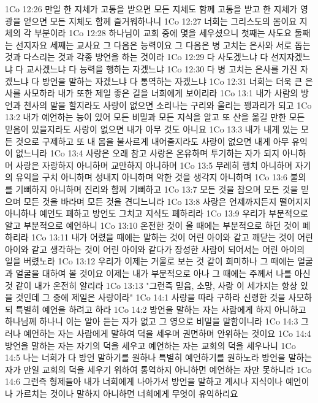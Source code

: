 1Co 12:26  만일 한 지체가 고통을 받으면 모든 지체도 함께 고통을 받고 한 지체가 영광을 얻으면 모든 지체도 함께 즐거워하나니
1Co 12:27  너희는 그리스도의 몸이요 지체의 각 부분이라
1Co 12:28  하나님이 교회 중에 몇을 세우셨으니 첫째는 사도요 둘째는 선지자요 세째는 교사요 그 다음은 능력이요 그 다음은 병 고치는 은사와 서로 돕는 것과 다스리는 것과 각종 방언을 하는 것이라
1Co 12:29  다 사도겠느냐 다 선지자겠느냐 다 교사겠느냐 다 능력을 행하는 자겠느냐
1Co 12:30  다 병 고치는 은사를 가진 자겠느냐 다 방언을 말하는 자겠느냐 다 통역하는 자겠느냐
1Co 12:31  너희는 더욱 큰 은사를 사모하라 내가 또한 제일 좋은 길을 너희에게 보이리라
1Co 13:1  내가 사람의 방언과 천사의 말을 할지라도 사랑이 없으면 소리나는 구리와 울리는 꽹과리가 되고
1Co 13:2  내가 예언하는 능이 있어 모든 비밀과 모든 지식을 알고 또 산을 옮길 만한 모든 믿음이 있을지라도 사랑이 없으면 내가 아무 것도 아니요
1Co 13:3  내가 내게 있는 모든 것으로 구제하고 또 내 몸을 불사르게 내어줄지라도 사랑이 없으면 내게 아무 유익이 없느니라
1Co 13:4  사랑은 오래 참고 사랑은 온유하며 투기하는 자가 되지 아니하며 사랑은 자랑하지 아니하며 교만하지 아니하며
1Co 13:5  무례히 행치 아니하며 자기의 유익을 구치 아니하며 성내지 아니하며 악한 것을 생각지 아니하며
1Co 13:6  불의를 기뻐하지 아니하며 진리와 함께 기뻐하고
1Co 13:7  모든 것을 참으며 모든 것을 믿으며 모든 것을 바라며 모든 것을 견디느니라
1Co 13:8  사랑은 언제까지든지 떨어지지 아니하나 예언도 폐하고 방언도 그치고 지식도 폐하리라
1Co 13:9  우리가 부분적으로 알고 부분적으로 예언하니
1Co 13:10  온전한 것이 올 때에는 부분적으로 하던 것이 폐하리라
1Co 13:11  내가 어렸을 때에는 말하는 것이 어린 아이와 같고 깨닫는 것이 어린 아이와 같고 생각하는 것이 어린 아이와 같다가 장성한 사람이 되어서는 어린 아이의 일을 버렸노라
1Co 13:12  우리가 이제는 거울로 보는 것 같이 희미하나 그 때에는 얼굴과 얼굴을 대하여 볼 것이요 이제는 내가 부분적으로 아나 그 때에는 주께서 나를 아신 것 같이 내가 온전히 알리라
1Co 13:13  "그런즉 믿음, 소망, 사랑 이 세가지는 항상 있을 것인데 그 중에 제일은 사랑이라"
1Co 14:1  사랑을 따라 구하라 신령한 것을 사모하되 특별히 예언을 하려고 하라
1Co 14:2  방언을 말하는 자는 사람에게 하지 아니하고 하나님께 하나니 이는 알아 듣는 자가 없고 그 영으로 비밀을 말함이니라
1Co 14:3  그러나 예언하는 자는 사람에게 말하여 덕을 세우며 권면하며 안위하는 것이요
1Co 14:4  방언을 말하는 자는 자기의 덕을 세우고 예언하는 자는 교회의 덕을 세우나니
1Co 14:5  나는 너희가 다 방언 말하기를 원하나 특별히 예언하기를 원하노라 방언을 말하는 자가 만일 교회의 덕을 세우기 위하여 통역하지 아니하면 예언하는 자만 못하니라
1Co 14:6  그런즉 형제들아 내가 너희에게 나아가서 방언을 말하고 계시나 지식이나 예언이나 가르치는 것이나 말하지 아니하면 너희에게 무엇이 유익하리요
